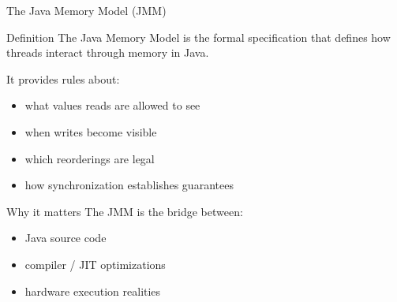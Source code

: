 \documentclass[aspectratio=169,11pt]{beamer}
\begin{document}
	\begin{frame}{The Java Memory Model (JMM)}
		\begin{block}{Definition}
			The Java Memory Model is the formal specification that defines how threads interact through memory in Java.
		\end{block}
		
		\vspace{0.3cm}
		
		It provides rules about:
		\begin{itemize}
			\item what values reads are allowed to see
			\item when writes become visible
			\item which reorderings are legal
			\item how synchronization establishes guarantees
		\end{itemize}
		
		\vspace{0.3cm}
		
		\begin{exampleblock}{Why it matters}
			The JMM is the bridge between:
			\begin{itemize}
				\item Java source code
				\item compiler / JIT optimizations
				\item hardware execution realities
			\end{itemize}
		\end{exampleblock}
	\end{frame}
	
\end{document}
